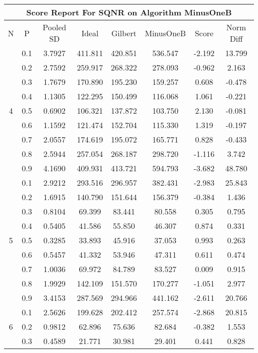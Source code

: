 \documentclass[11pt,a4paper]{report}
\begin{document}
\begin{longtable}{ | c | c || c | c | c | c | c | c | }
\hline
\multicolumn{8}{|c|}{ Score Report For SQNR on Algorithm MinusOneB} \\
\hline
N & P & Pooled SD &  Ideal &  Gilbert & MinusOneB  & Score & Norm Diff \\
 \hline
 \hline
 \endhead
\multirow{9}{*}{4} & 0.1 & 3.7927 & 411.811 & 420.851 & 536.547 & -2.192 & 13.799 \\
 & 0.2 & 2.7592 & 259.917 & 268.322 & 278.093 & -0.962 & 2.163 \\
 & 0.3 & 1.7679 & 170.890 & 195.230 & 159.257 & 0.608 & -0.478 \\
 & 0.4 & 1.1305 & 122.295 & 150.499 & 116.068 & 1.061 & -0.221 \\
 & 0.5 & 0.6902 & 106.321 & 137.872 & 103.750 & 2.130 & -0.081 \\
 & 0.6 & 1.1592 & 121.474 & 152.704 & 115.330 & 1.319 & -0.197 \\
 & 0.7 & 2.0557 & 174.619 & 195.072 & 165.771 & 0.828 & -0.433 \\
 & 0.8 & 2.5944 & 257.054 & 268.187 & 298.720 & -1.116 & 3.742 \\
 & 0.9 & 4.1690 & 409.931 & 413.721 & 594.793 & -3.682 & 48.780 \\
 \hline
\multirow{9}{*}{5} & 0.1 & 2.9212 & 293.516 & 296.957 & 382.431 & -2.983 & 25.843 \\
 & 0.2 & 1.6915 & 140.790 & 151.644 & 156.379 & -0.384 & 1.436 \\
 & 0.3 & 0.8104 & 69.399 & 83.441 & 80.558 & 0.305 & 0.795 \\
 & 0.4 & 0.5405 & 41.586 & 55.850 & 46.307 & 0.874 & 0.331 \\
 & 0.5 & 0.3285 & 33.893 & 45.916 & 37.053 & 0.993 & 0.263 \\
 & 0.6 & 0.5457 & 41.332 & 53.946 & 47.311 & 0.611 & 0.474 \\
 & 0.7 & 1.0036 & 69.972 & 84.789 & 83.527 & 0.009 & 0.915 \\
 & 0.8 & 1.9929 & 142.109 & 151.570 & 170.277 & -1.051 & 2.977 \\
 & 0.9 & 3.4153 & 287.569 & 294.966 & 441.162 & -2.611 & 20.766 \\
 \hline
\multirow{9}{*}{6} & 0.1 & 2.5626 & 199.628 & 202.412 & 257.574 & -2.868 & 20.815 \\
 & 0.2 & 0.9812 & 62.896 & 75.636 & 82.684 & -0.382 & 1.553 \\
 & 0.3 & 0.4589 & 21.771 & 30.981 & 29.401 & 0.441 & 0.828 \\

\end{longtable}
\end{document}

